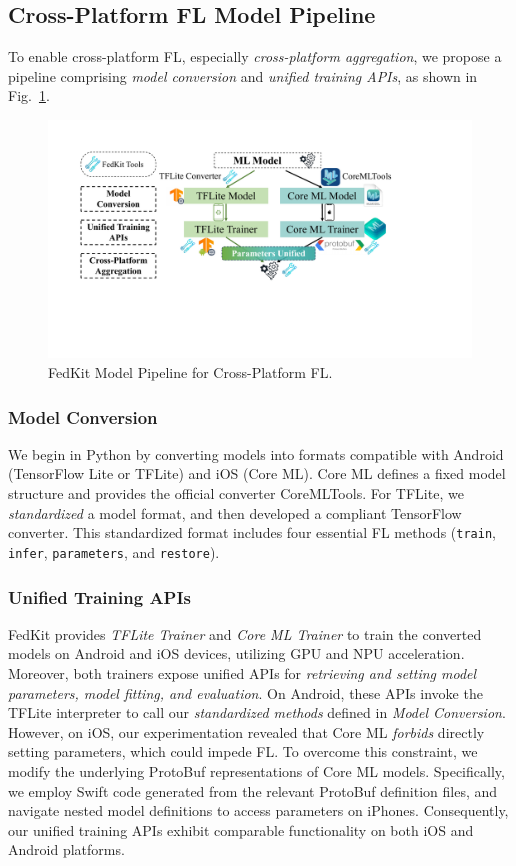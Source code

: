 \documentclass[letterpaper]{article} %
\begin{document}
\subsection{Cross-Platform FL Model Pipeline}

To enable cross-platform FL,
especially \textit{cross-platform aggregation},
we propose a pipeline comprising
\textit{model conversion} and
\textit{unified training APIs},
as shown in Fig.~\ref{cross_fl}.

\begin{figure}
    \centering
    \includegraphics*[width=\linewidth]{model_pipeline.pdf}
    \caption{FedKit Model Pipeline for Cross-Platform FL.}
    \label{cross_fl}
\end{figure}

\subsubsection{Model Conversion}
We begin in Python by converting models into formats compatible with
Android (TensorFlow Lite or TFLite) and iOS (Core ML).
Core ML defines a fixed model structure and provides
the official converter CoreMLTools.
For TFLite, we \textit{standardized} a model format, and then
developed a compliant TensorFlow converter.
This standardized format includes
four essential FL methods
(\lstinline{train}, \lstinline{infer}, \lstinline{parameters},
and \lstinline{restore}).


\subsubsection{Unified Training APIs}
FedKit provides \textit{TFLite Trainer} and \textit{Core ML Trainer} to
train the converted models on Android and iOS devices,
utilizing GPU and NPU acceleration.
Moreover, both trainers expose unified APIs for
\textit{retrieving and setting model parameters,
model fitting, and evaluation}.
On Android, these APIs invoke the TFLite interpreter to call
our \textit{standardized methods} defined in \textit{Model Conversion}.
However, on iOS, our experimentation revealed that
Core ML \textit{forbids} directly setting parameters, which could impede FL.
To overcome this constraint,
we modify the underlying ProtoBuf representations of
Core ML models.
Specifically,
we employ Swift code generated from the relevant ProtoBuf definition files,
and navigate nested model definitions to access parameters on iPhones.
Consequently, our unified training APIs exhibit comparable functionality on
both iOS and Android platforms.
\end{document}
